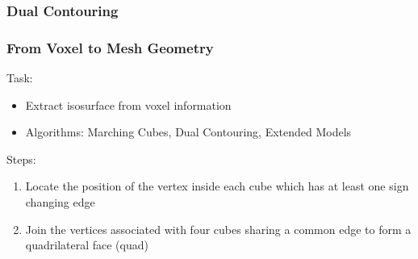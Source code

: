 
\subsubsection{Dual Contouring}

\begin{frame}
	\frametitle{From Voxel to Mesh Geometry}
	Task:
	\begin{itemize}
	\item Extract isosurface from voxel information
	\item Algorithms: Marching Cubes, Dual Contouring, Extended Models
	\end{itemize}
	Steps: 
	\begin{enumerate}
		\item Locate the position of the vertex inside each cube which has at least one sign changing
		edge
		\item Join the vertices associated with four cubes sharing a common edge to form a quadrilateral face (quad)
	\end{enumerate}
	\begin{minipage}{0.49\textwidth}
\end{minipage}
\end{frame}
